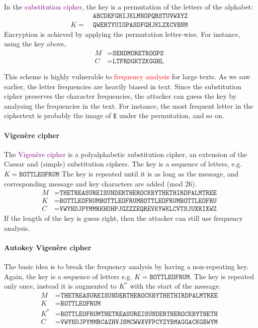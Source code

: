 \documentclass[a4paper, 11pt, openany]{book}
\numberwithin{equation}{section}
\theoremstyle{plain}
\theoremstyle{definition}
\newcommand{\Important}[1]{\textcolor{red}{#1}}
\newcommand{\Define}[1]{\textcolor{purple}{#1}}
\begin{document}
In the \Define{substitution cipher}, the key is a permutation of the letters of the alphabet:
\begin{align*}
          &\texttt{ABCDEFGHIJKLMNOPQRSTUVWXYZ}\\
       K = \ &\texttt{QWERTYUIOPASDFGHJKLZXCVBNM}
\end{align*}
Encryption is achieved by applying the permutation letter-wise. For instance, using the key above,
\begin{align*}
    M &= \texttt{SENDMORETROOPS}\\
    C &= \texttt{LTFRDGKTZKGGHL}
\end{align*}

This scheme is highly vulnerable to \Important{frequency analysis} for large texts. As we saw earlier, the letter frequencies are heavily biased in text. Since the substitution cipher preserves the character frequencies, the attacker can guess the key by analysing the frequencies in the text. For instance, the most frequent letter in the ciphertext is probably the image of \texttt{E} under the permutation, and so on.




\paragraph{Vigen\`ere cipher}
    
The \Define{Vigen\`ere cipher} is a polyalphabetic substitution cipher, an extension of the Caesar and (simple) substitution ciphers. The key is a sequence of letters, e.g. $K = \texttt{BOTTLEOFRUM}$
The key is repeated until it is as long as the message, and corresponding message and key characters are added (mod 26).
\begin{align*}
    M &= \texttt{THETREASUREISUNDERTHEROCKBYTHETHIRDPALMTREE}\\
    K &= \texttt{BOTTLEOFRUMBOTTLEOFRUMBOTTLEOFRUMBOTTLEOFRU}\\
    C &= \texttt{VWYNDJPYMMRKHOHPJGZZZEQREVKYWKLCVTSJUXRIXWZ}
\end{align*}
If the length of the key is guess right, then the attacker can still use frequency analysis.



\paragraph{Autokey Vigenère cipher}
The basic idea is to break the frequency analysis by having a non-repeating key. Again, the key is a sequence of letters e.g. $K = \texttt{BOTTLEOFRUM}$. The key is repeated only once, instead it is augmented to $K^*$ with the start of the message.
\begin{align*}
    M &= \texttt{THETREASUREISUNDERTHEROCKBYTHETHIRDPALMTREE}\\
    K &= \texttt{BOTTLEOFRUM}\\
    K^* &= \texttt{BOTTLEOFRUMTHETREASUREISUNDERTHEROCKBYTHETH}\\
    C &= \texttt{VWYNDJPYMMRCAZHVJSMCWWXVFPCYZYBMAGGACKGBWYM}
\end{align*}
\end{document}
